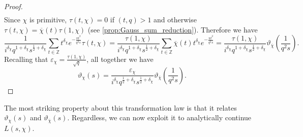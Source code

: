 \documentclass[12pt]{book}
\theoremstyle{definition}\newframedtheorem{method}{Method}
\newcommand{\Z}{\mathbb{Z}}
\renewcommand{\d}{\delta}
\newcommand{\e}{\varepsilon}
\newcommand{\vt}{\vartheta}
\newcommand{\<}{\langle}
\renewcommand{\>}{\rangle}
\newcommand{\conj}{\overline}
\newcommand{\cchi}{\conj{\chi}}
\begin{document}
\begin{proof}
\begin{align*}
        \end{align*}
        Since $\chi$ is primitive, $\tau(t,\chi) = 0$ if $(t,q) > 1$ and otherwise $\tau(t,\chi) = \cchi(t)\tau(1,\chi)$ (see \cref{prop:Gauss_sum_reduction}). Therefore we have
        \[
          \frac{1}{i^{\d_{\chi}}q^{1+\d_{\chi}}s^{\frac{1}{2}+\d_{\chi}}}\sum_{t \in \Z}t^{\d_{\chi}}e^{-\frac{\pi t^{2}}{q^{2}s}}\tau(t,\chi) = \frac{\tau(1,\chi)}{i^{\d_{\chi}}q^{1+\d_{\chi}}s^{\frac{1}{2}+\d_{\chi}}}\sum_{t \in \Z}\cchi(t)t^{\d_{\chi}}e^{-\frac{\pi t^{2}}{q^{2}s}} = \frac{\tau(1,\chi)}{i^{\d_{\chi}}q^{1+\d_{\chi}}s^{\frac{1}{2}+\d_{\chi}}}\vt_{\cchi}\left(\frac{1}{q^{2}s}\right).
        \]
        Recalling that $\e_{\chi} = \frac{\tau(1,\chi)}{\sqrt{q}}$, all together we have
        \[
          \vt_{\chi}(s) = \frac{\e_{\chi}}{i^{\d_{\chi}}q^{\frac{1}{2}+\d_{\chi}}s^{\frac{1}{2}+\d_{\chi}}}\vt_{\cchi}\left(\frac{1}{q^{2}s}\right).
        \]
      \end{proof}
      The most striking property about this transformation law is that it relates $\vt_{\chi}(s)$ and $\vt_{\cchi}(s)$. Regardless, we can now exploit it to analytically continue $L(s,\chi)$.
\end{document}
